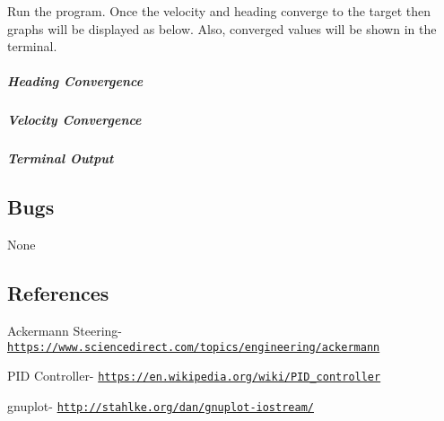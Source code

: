 Run the program. Once the velocity and heading converge to the target then graphs will be displayed as below. Also, converged values will be shown in the terminal.

\subparagraph*{Heading Convergence}

 

\subparagraph*{Velocity Convergence}

 

\subparagraph*{Terminal Output}

 

\subsection*{Bugs}

None

\subsection*{References}


\begin{DoxyItemize}
\item Ackermann Steering-\/ \href{https://www.sciencedirect.com/topics/engineering/ackermann}{\tt https\+://www.\+sciencedirect.\+com/topics/engineering/ackermann}
\item P\+ID Controller-\/ \href{https://en.wikipedia.org/wiki/PID_controller}{\tt https\+://en.\+wikipedia.\+org/wiki/\+P\+I\+D\+\_\+controller}
\item gnuplot-\/ \href{http://stahlke.org/dan/gnuplot-iostream/}{\tt http\+://stahlke.\+org/dan/gnuplot-\/iostream/} 
\end{DoxyItemize}